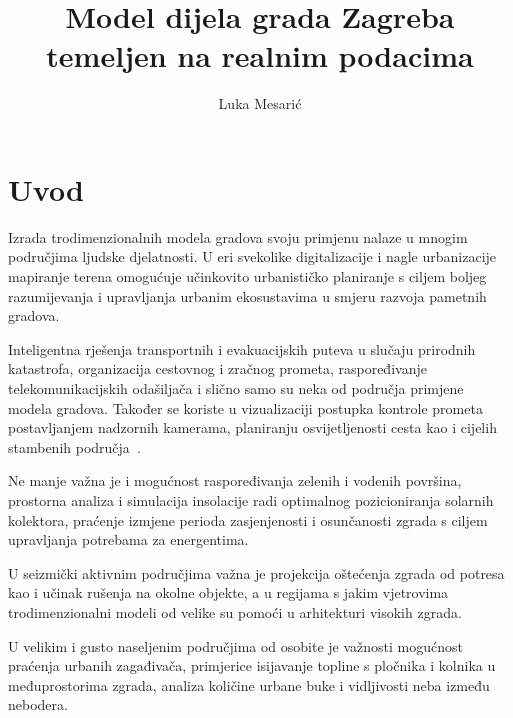 \documentclass[times, utf8, zavrsni, numeric]{fer}
\begin{document}
\nocite{*}


\title{Model dijela grada Zagreba temeljen na realnim podacima}

\author{Luka Mesarić}

\maketitle

\izvornik

\zahvala{}

\tableofcontents


\renewcommand{\lstlistingname}{Algoritam}
\lstset{language=Python, basicstyle=\footnotesize, numbers=left}



\chapter{Uvod}
	
	Izrada trodimenzionalnih modela gradova svoju primjenu nalaze u mnogim područjima ljudske djelatnosti.
	U eri svekolike digitalizacije i nagle urbanizacije mapiranje terena omogućuje učinkovito urbanističko planiranje s ciljem boljeg razumijevanja i upravljanja urbanim ekosustavima u smjeru razvoja pametnih gradova.
	
	Inteligentna rješenja transportnih i evakuacijskih puteva u slučaju prirodnih katastrofa, organizacija cestovnog i zračnog prometa, raspoređivanje telekomunikacijskih odašiljača i slično samo su neka od područja primjene modela gradova.
	Također se koriste u vizualizaciji postupka kontrole prometa postavljanjem nadzornih kamerama, planiranju osvijetljenosti cesta kao i cijelih stambenih područja~\cite{biljeckimodels}.
	
	Ne manje važna je i mogućnost raspoređivanja zelenih i vodenih površina, prostorna analiza i simulacija insolacije radi optimalnog pozicioniranja solarnih kolektora, praćenje izmjene perioda zasjenjenosti i osunčanosti zgrada s ciljem upravljanja potrebama za energentima.
	
	U seizmički aktivnim područjima važna je projekcija oštećenja zgrada od potresa kao i učinak rušenja na okolne objekte, a u regijama s jakim vjetrovima trodimenzionalni modeli od velike su pomoći u arhitekturi visokih zgrada.
	
	U velikim i gusto naseljenim područjima od osobite je važnosti mogućnost praćenja urbanih zagađivača, primjerice isijavanje topline s pločnika i kolnika u međuprostorima zgrada, analiza količine urbane buke i vidljivosti neba između nebodera.
	
\end{document}
